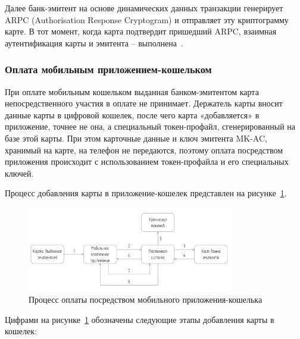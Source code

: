 Далее банк-эмитент на основе динамических данных транзакции генерирует ARPC (Authorisation Response Cryptogram) и отправляет эту криптограмму карте.
В тот момент, когда карта подтвердит пришедший ARPC, взаимная аутентификация карты и эмитента – выполнена~\cite{emv_card_mechanism}.


\subsubsection{Оплата мобильным приложением-кошельком}

При оплате мобильным кошельком выданная банком-эмитентом карта непосредственного участия в оплате не принимает.
Держатель карты вносит данные карты в цифровой кошелек, после чего карта «добавляется» в приложение, точнее не она, а специальный токен-профайл, сгенерированный на базе этой карты.
При этом карточные данные и ключ эмитента MK-AC, хранимый на карте, на телефон не передаются, поэтому оплата посредством приложения происходит с использованием токен-профайла и его специальных ключей.

Процесс добавления карты в приложение-кошелек представлен на рисунке~\ref{fig:add_mob_cardholder}.

\begin{figure}[H]
    \centering
    \includegraphics[width=0.8\textwidth]{images/research/add_mob_cardholder}
    \caption{\centering Процесс оплаты посредством мобильного приложения-кошелька}
    \label{fig:add_mob_cardholder}
\end{figure}

Цифрами на рисунке~\ref{fig:add_mob_cardholder} обозначены следующие этапы добавления карты в кошелек:

